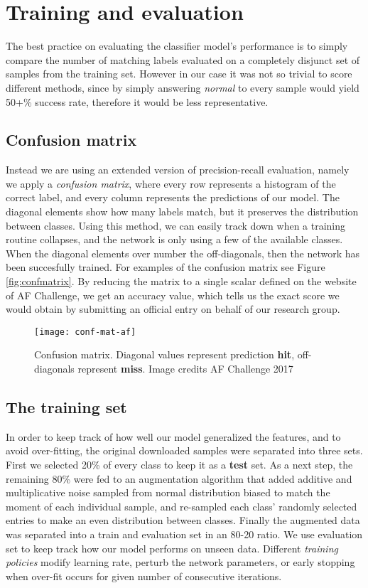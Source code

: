 \chapter{Training and evaluation}

The best practice on evaluating the classifier model's performance is to simply compare the number of matching labels evaluated on a completely disjunct set of samples from the training set.
However in our case it was not so trivial to score different methods, since by simply answering \textit{normal} to every sample would yield 50+\% success rate, therefore it would be less representative.

\section{Confusion matrix}
Instead we are using an extended version of precision-recall evaluation, namely we apply a \textit{confusion matrix}, where every row represents a histogram of the correct label, and every column represents the predictions of our model. The diagonal elements show how many labels match, but it preserves the distribution between classes.
Using this method, we can easily track down when a training routine collapses, and the network is only using a few of the available classes. When the diagonal elements over number the off-diagonals, then the network has been succesfully trained. For examples of the confusion matrix see Figure \ref{fig:confmatrix}.
By reducing the matrix to a single scalar defined on the website of AF Challenge, we get an accuracy value, which tells us the exact score we would obtain by submitting an official entry on behalf of our research group.

\begin{figure}
  \centering
  \texttt{[image: conf-mat-af]}
  \caption{Confusion matrix. Diagonal values represent prediction \textbf{hit}, off-diagonals represent \textbf{miss}. Image credits AF Challenge 2017}
  \label{fig:FCN}
\end{figure}

\section{The training set}
In order to keep track of how well our model generalized the features, and to avoid over-fitting, the original downloaded samples were separated into three sets.
First we selected 20\% of every class to keep it as a \textbf{test} set.
As a next step, the remaining 80\% were fed to an augmentation algorithm that added additive and multiplicative noise sampled from normal distribution biased to match the moment of each individual sample, and re-sampled each class' randomly selected entries to make an even distribution between classes.
Finally the augmented data was separated into a train and evaluation set in an 80-20 ratio.
We use evaluation set to keep track how our model performs on unseen data.
Different \textit{training policies} modify learning rate, perturb the network parameters, or early stopping when over-fit occurs for given number of consecutive iterations.

